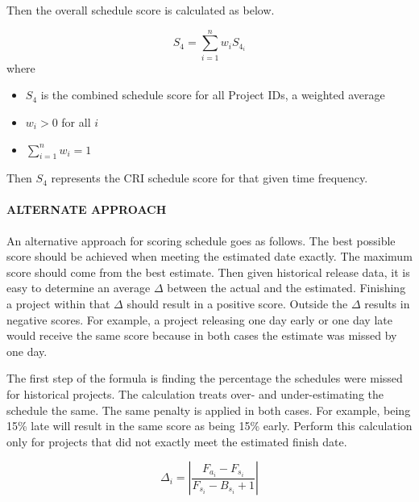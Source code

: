 \documentclass[SDSUThesis.tex]{subfiles}
\begin{document}
                Then the overall schedule score is calculated as below.
                
                \[
                    S_{4} = \sum\limits^n_{i=1} w_i S_{4_i}
                \]
                where
                \begin{itemize}
                    \item $S_4$ is the combined schedule score for all Project IDs, 
                    a weighted average
                    \item $w_i > 0$ for all $i$
                    \item $\sum\limits^n_{i=1} w_i = 1$
                \end{itemize}
                
                Then $S_4$ represents the CRI schedule score for that given time 
                frequency.
    
            \paragraph{ALTERNATE APPROACH}
                An alternative approach for scoring schedule goes as follows.
                The best possible score should be achieved
                when meeting the estimated date exactly.  The maximum score
                should come from the best estimate.  Then given historical
                release data, it is easy to determine an 
                average $\Delta$ between the actual and the estimated.  
                Finishing a project within that $\Delta$ should result 
                in a positive score.  Outside the $\Delta$ results in
                negative scores.  For example, a project releasing
                one day early or one day late would receive the same score
                because in both cases the estimate was missed by one day.
                
                The first step of the formula is finding the percentage the schedules were missed for 
                historical projects.  The calculation treats over- and under-estimating the schedule
                the same.  The same penalty is applied in both cases.  For example, being 15\% late
                will result in the same score as being 15\% early. Perform this calculation
                only for projects that did not exactly meet the estimated finish date.
                
                \begin{displaymath}
                    \Delta_i = \left| \frac{F_{a_i} - F_{s_i}}{ F_{s_i} - B_{s_i} + 1} \right|
                \end{displaymath}
                
\end{document}
